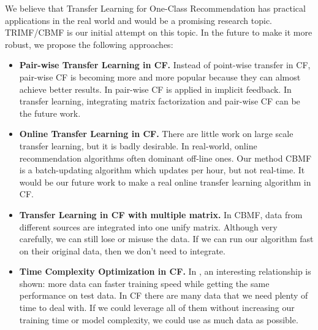 We believe that Transfer Learning for One-Class Recommendation has practical applications in the real world and would be a promising research topic. TRIMF/CBMF is our initial attempt on this topic. In the future to make it more robust, we propose the following approaches:
\begin{itemize}
\item {\bf Pair-wise Transfer Learning in CF.} Instead of point-wise transfer in CF, pair-wise CF is becoming more and more popular because they can almost achieve better results. In \cite{DBLP:dblp_conf/recsys/LercheJ14, DBLP:dblp_conf/recsys/Aiolli14} pair-wise CF is applied in implicit feedback. In transfer learning, integrating matrix factorization and pair-wise CF can be the future work.
\item {\bf Online Transfer Learning in CF.} There are little work on large scale transfer learning, but it is badly desirable. In real-world, online recommendation algorithms often dominant off-line ones. Our method CBMF is a batch-updating algorithm which updates per hour, but not real-time. It would be our future work to make a real online transfer learning algorithm in CF.
\item {\bf Transfer Learning in CF with multiple matrix.} In CBMF, data from different sources are integrated into one unify matrix. Although very carefully, we can still lose or misuse the data. If we can run our algorithm fast on their original data, then we don't need to integrate.
\item {\bf Time Complexity Optimization in CF.} In \cite{Shalev-Shwartz:2008:SOI:1390156.1390273}, an interesting relationship is shown: more data can faster training speed while getting the same performance on test data. In CF there are many data that we need plenty of time to deal with. If we could leverage all of them without increasing our training time or model complexity, we could use as much data as possible.
\end{itemize} 
